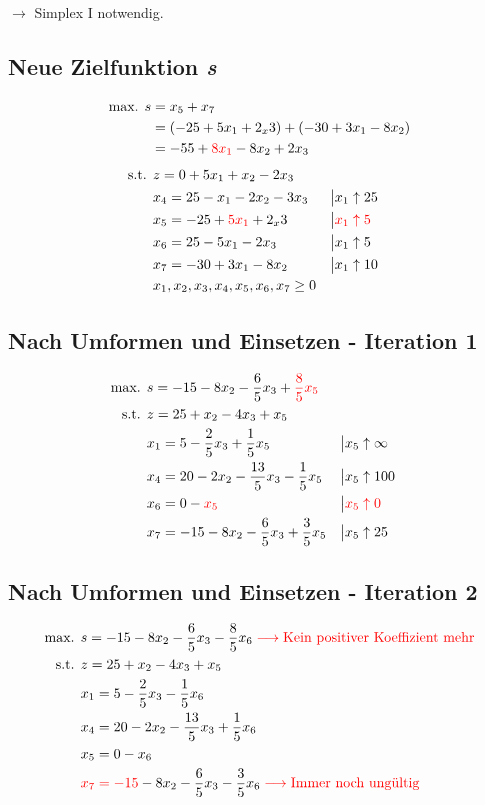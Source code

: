 \documentclass[a4paper,11pt]{article}
\begin{document}
$\to$ Simplex I notwendig.

\subsection*{Neue Zielfunktion \emph{s}}
\begin{align*}
\text{max. } s &= x_5 + x_7 \\
&= (-25 + 5x_1 + 2_x3) + (-30 + 3x_1 - 8x_2) \\
&= -55 + {\color{red} 8x_1} - 8x_2 + 2x_3
\end{align*}
\begin{align*}
\text{s.t. } & z = 0 + 5x_1 + x_2 - 2x_3 \\
& x_4 = 25 - x_1 - 2x_2 - 3x_3 &&\big| x_1 \uparrow 25 \\
& x_5 = -25 + {\color{red} 5x_1} + 2_x3 &&\big| \color{red} x_1 \uparrow 5 \\
& x_6 = 25 - 5x_1 - 2x_3 &&\big| x_1 \uparrow 5 \\
& x_7 = -30 + 3x_1 - 8x_2 &&\big| x_1 \uparrow 10 \\
& x_1, x_2, x_3, x_4, x_5, x_6, x_7 \ge 0
\end{align*}

\subsection*{Nach Umformen und Einsetzen - Iteration 1}
\begin{align*}
\text{max. } & s = -15 - 8x_2 - \frac{6}{5}x_3 + {\color{red} \frac{8}{5}x_5}\\
\text{s.t. } & z = 25 + x_2 - 4x_3 +x_5 \\
& x_1 = 5 - \frac{2}{5}x_3 + \frac{1}{5}x_5 &&\big| x_5 \uparrow \infty \\
& x_4 = 20 - 2x_2 - \frac{13}{5}x_3 - \frac{1}{5}x_5 &&\big| x_5 \uparrow 100 \\
& x_6 = 0 - {\color{red} x_5} &&\big| \color{red} x_5 \uparrow 0 \\
& x_7 = -15 - 8x_2 - \frac{6}{5}x_3 + \frac{3}{5}x_5 &&\big| x_5 \uparrow 25
\end{align*}

\subsection*{Nach Umformen und Einsetzen - Iteration 2}
\begin{align*}
\text{max. } & s = -15 - 8x_2 - \frac{6}{5}x_3 - \frac{8}{5}x_6 \color{red} \longrightarrow \text{Kein positiver Koeffizient mehr} \\
\text{s.t. } & z = 25 + x_2 - 4x_3 +x_5 \\
& x_1 = 5 - \frac{2}{5}x_3 - \frac{1}{5}x_6 \\
& x_4 = 20 - 2x_2 - \frac{13}{5}x_3 + \frac{1}{5}x_6 \\
& x_5 = 0 - x_6 \\
& {\color{red} x_7 = -15} - 8x_2 - \frac{6}{5}x_3 - \frac{3}{5}x_6 \color{red} \longrightarrow \text{Immer noch ungültig}
\end{align*}
\end{document}
